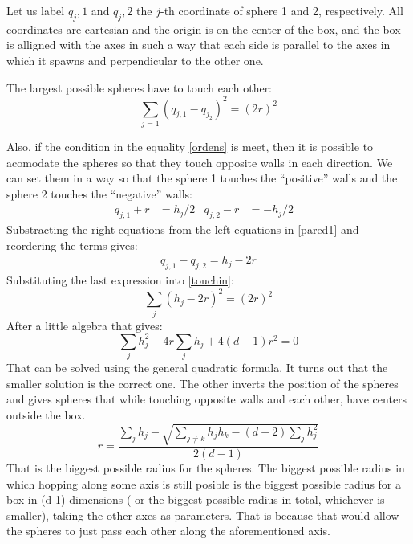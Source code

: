 \documentclass[superscriptaddress,pre,reprint,showpacs,onecolumn]{revtex4-1}
\begin{document}
Let us label $q_j,1$ and $q_j,2$ the $j$-th coordinate of sphere 1 and 2,
respectively. All coordinates are cartesian and the origin is on the
center of the box, and the box is alligned with the axes in such a way
that each side is parallel to the axes in which it spawns and perpendicular
to the other one. 

The largest possible spheres have to touch each other:
\begin{equation}\label{touchin}
  \sum_{j=1}(q_{j,1}-q_{j_2})^2=(2 r)^2
\end{equation}

Also, if the condition in the equality \ref{ordens} is meet, then
it is possible to acomodate the spheres so that they touch opposite walls in
each direction. We can set them in a way so that the sphere 1 touches the
``positive'' walls and the sphere 2 touches the ``negative'' walls:
\begin{align}\label{pared1}
  q_{j,1}+r & =h_j/2 & q_{j,2}-r & =-h_j/2 &
\end{align}
Substracting the right equations from the left equations in \ref{pared1}
and reordering the terms gives:
\begin{align}
  q_{j,1}-q_{j,2}=h_j-2r
\end{align}
Substituting the last expression into \ref{touchin}:
\begin{equation}
  \sum_j(h_j-2r)^2=(2r)^2
\end{equation}
After a little algebra that gives:
\begin{equation}
  \sum_j h_j^2 -4r\sum_j h_j + 4(d-1)r^2=0
\end{equation}
That can be solved using the general quadratic formula.
It turns out that the smaller solution is the correct one. The other
inverts the position of the spheres and gives spheres that while
touching opposite walls and each other, have centers outside the box.
\begin{equation}\label{rmax}
  r=\frac{\sum_j h_j - \sqrt{\sum_{j\neq k}h_j h_k-(d-2)\sum_j{h_j^2}}}{2(d-1)}
\end{equation}
That is the biggest possible radius for the spheres.
The biggest possible radius in which hopping along some axis is still
posible is the biggest possible radius for a box in (d-1) dimensions
( or the biggest possible radius in total, whichever is smaller),
taking the other axes as parameters. That is because that would allow
the spheres to just pass each other along the aforementioned axis.
\end{document}
